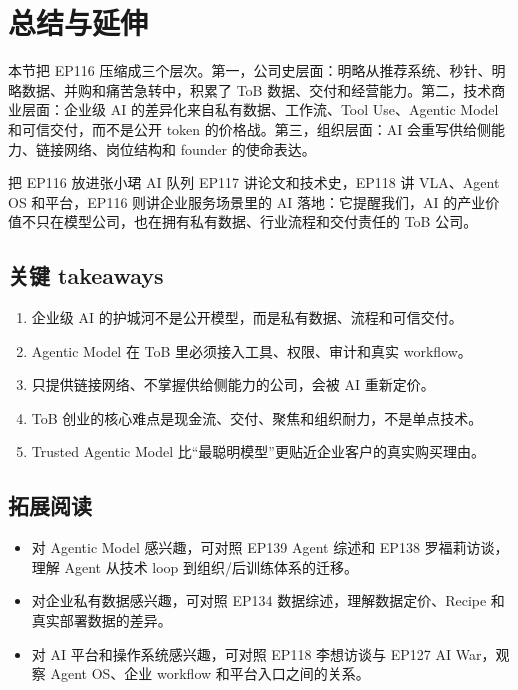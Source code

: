 \section{总结与延伸}

本节把 EP116 压缩成三个层次。第一，公司史层面：明略从推荐系统、秒针、明略数据、并购和痛苦急转中，积累了 ToB 数据、交付和经营能力。第二，技术商业层面：企业级 AI 的差异化来自私有数据、工作流、Tool Use、Agentic Model 和可信交付，而不是公开 token 的价格战。第三，组织层面：AI 会重写供给侧能力、链接网络、岗位结构和 founder 的使命表达。

\begin{importantbox}{把 EP116 放进张小珺 AI 队列}
EP117 讲论文和技术史，EP118 讲 VLA、Agent OS 和平台，EP116 则讲企业服务场景里的 AI 落地：它提醒我们，AI 的产业价值不只在模型公司，也在拥有私有数据、行业流程和交付责任的 ToB 公司。
\end{importantbox}

\subsection{关键 takeaways}

\begin{enumerate}
\item 企业级 AI 的护城河不是公开模型，而是私有数据、流程和可信交付。
\item Agentic Model 在 ToB 里必须接入工具、权限、审计和真实 workflow。
\item 只提供链接网络、不掌握供给侧能力的公司，会被 AI 重新定价。
\item ToB 创业的核心难点是现金流、交付、聚焦和组织耐力，不是单点技术。
\item Trusted Agentic Model 比“最聪明模型”更贴近企业客户的真实购买理由。
\end{enumerate}

\subsection{拓展阅读}

\begin{itemize}
\item 对 Agentic Model 感兴趣，可对照 EP139 Agent 综述和 EP138 罗福莉访谈，理解 Agent 从技术 loop 到组织/后训练体系的迁移。
\item 对企业私有数据感兴趣，可对照 EP134 数据综述，理解数据定价、Recipe 和真实部署数据的差异。
\item 对 AI 平台和操作系统感兴趣，可对照 EP118 李想访谈与 EP127 AI War，观察 Agent OS、企业 workflow 和平台入口之间的关系。
\end{itemize}


